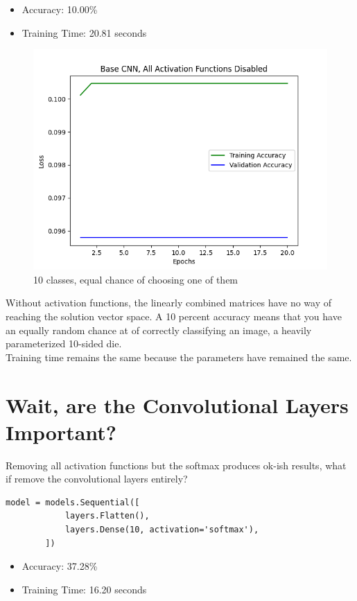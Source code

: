 \documentclass{article}
\begin{document}
    \begin{itemize}
        \item Accuracy: 10.00\%
        \item Training Time: 20.81 seconds
    \end{itemize}

    \begin{figure}[!htbp]
        \centerline{\includegraphics[width=0.55\columnwidth]{Base CNN, All Activation Functions Disabled}}
        \caption{10 classes, equal chance of choosing one of them}
        \label{fig:no-acts}
    \end{figure}

    Without activation functions, the linearly combined matrices have no way of reaching the solution vector space.
    A 10 percent accuracy means that you have an equally random chance at of correctly classifying an image, a heavily parameterized 10-sided die.
    \\
    Training time remains the same because the parameters have remained the same.

    \section{Wait, are the Convolutional Layers Important?}\label{cnn-important}

    Removing all activation functions but the softmax produces ok-ish results, what if remove the convolutional layers entirely?

    \begin{lstlisting}[label={lst:just softmax}]
        model = models.Sequential([
            layers.Flatten(),
            layers.Dense(10, activation='softmax'),
        ])
    \end{lstlisting}

    \begin{itemize}
        \item Accuracy: 37.28\%
        \item Training Time: 16.20 seconds
    \end{itemize}
\end{document}
